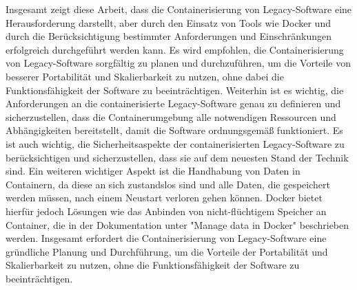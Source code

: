 Insgesamt zeigt diese Arbeit, dass die Containerisierung von Legacy-Software eine Herausforderung darstellt, aber durch den Einsatz von Tools wie Docker und durch die Berücksichtigung bestimmter Anforderungen und Einschränkungen erfolgreich durchgeführt werden kann. Es wird empfohlen, die Containerisierung von Legacy-Software sorgfältig zu planen und durchzuführen, um die Vorteile von besserer Portabilität und Skalierbarkeit zu nutzen, ohne dabei die Funktionsfähigkeit der Software zu beeinträchtigen. Weiterhin ist es wichtig, die Anforderungen an die containerisierte Legacy-Software genau zu definieren und sicherzustellen, dass die Containerumgebung alle notwendigen Ressourcen und Abhängigkeiten bereitstellt, damit die Software ordnungsgemäß funktioniert. Es ist auch wichtig, die Sicherheitsaspekte der containerisierten Legacy-Software zu berücksichtigen und sicherzustellen, dass sie auf dem neuesten Stand der Technik sind. Ein weiteren wichtiger Aspekt ist die Handhabung von Daten in Containern, da diese an sich zustandslos sind und alle Daten, die gespeichert werden müssen, nach einem Neustart verloren gehen können. Docker bietet hierfür jedoch Lösungen wie das Anbinden von nicht-flüchtigem Speicher an Container, die in der Dokumentation unter "Manage data in Docker" beschrieben werden. Insgesamt erfordert die Containerisierung von Legacy-Software eine gründliche Planung und Durchführung, um die Vorteile der Portabilität und Skalierbarkeit zu nutzen, ohne die Funktionsfähigkeit der Software zu beeinträchtigen.

